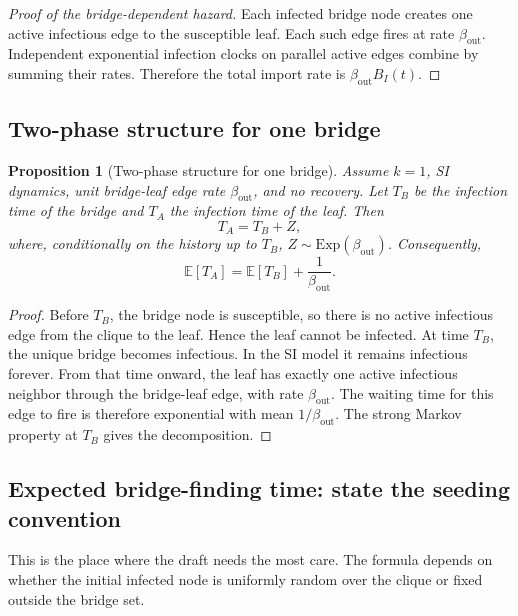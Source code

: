 \documentclass[12pt,a4paper]{article}
\newtheorem{proposition}{Proposition}
\theoremstyle{definition}
\newcommand{\E}{\mathbb{E}}
\newcommand{\1}{\mathbf{1}}
\newcommand{\Exp}{\mathrm{Exp}}
\begin{document}
\begin{proof}[Proof of the bridge-dependent hazard]
Each infected bridge node creates one active infectious edge to the susceptible leaf.  Each such edge fires at rate $\beta_{\mathrm{out}}$.  Independent exponential infection clocks on parallel active edges combine by summing their rates.  Therefore the total import rate is $\beta_{\mathrm{out}}B_I(t)$.
\end{proof}

\subsection{Two-phase structure for one bridge}

\begin{proposition}[Two-phase structure for one bridge]
Assume $k=1$, SI dynamics, unit bridge-leaf edge rate $\beta_{\mathrm{out}}$, and no recovery.  Let $T_B$ be the infection time of the bridge and $T_A$ the infection time of the leaf.  Then
\begin{equation}
    T_A=T_B+Z,
\end{equation}
where, conditionally on the history up to $T_B$, $Z\sim\Exp(\beta_{\mathrm{out}})$.  Consequently,
\begin{equation}
    \E[T_A]=\E[T_B]+\frac{1}{\beta_{\mathrm{out}}}.
\end{equation}
\end{proposition}

\begin{proof}
Before $T_B$, the bridge node is susceptible, so there is no active infectious edge from the clique to the leaf.  Hence the leaf cannot be infected.  At time $T_B$, the unique bridge becomes infectious.  In the SI model it remains infectious forever.  From that time onward, the leaf has exactly one active infectious neighbor through the bridge-leaf edge, with rate $\beta_{\mathrm{out}}$.  The waiting time for this edge to fire is therefore exponential with mean $1/\beta_{\mathrm{out}}$.  The strong Markov property at $T_B$ gives the decomposition.
\end{proof}

\subsection{Expected bridge-finding time: state the seeding convention}

This is the place where the draft needs the most care.  The formula depends on whether the initial infected node is uniformly random over the clique or fixed outside the bridge set.
\end{document}
